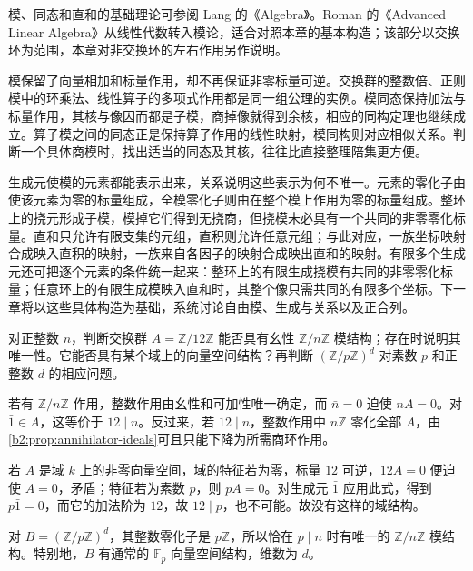 \ProseParagraphBreak
模、同态和直和的基础理论可参阅 Lang 的《Algebra》\cite[CHAPTER III, \S\S 1--3]{Lang2002}。Roman 的《Advanced Linear Algebra》\cite[Chapter 4, pp. 109--124]{Roman2008AdvancedLinearAlgebra}从线性代数转入模论，适合对照本章的基本构造；该部分以交换环为范围，本章对非交换环的左右作用另作说明。






\begin{chaptersummary}
	模保留了向量相加和标量作用，却不再保证非零标量可逆。交换群的整数倍、正则模中的环乘法、线性算子的多项式作用都是同一组公理的实例。模同态保持加法与标量作用，其核与像因而都是子模，商掉像就得到余核，相应的同构定理也继续成立。算子模之间的同态正是保持算子作用的线性映射，模同构则对应相似关系。判断一个具体商模时，找出适当的同态及其核，往往比直接整理陪集更方便。

	\ProseParagraphBreak
	生成元使模的元素都能表示出来，关系说明这些表示为何不唯一。元素的零化子由使该元素为零的标量组成，全模零化子则由在整个模上作用为零的标量组成。整环上的挠元形成子模，模掉它们得到无挠商，但挠模未必具有一个共同的非零零化标量。直和只允许有限支集的元组，直积则允许任意元组；与此对应，一族坐标映射合成映入直积的映射，一族来自各因子的映射合成映出直和的映射。有限多个生成元还可把逐个元素的条件统一起来：整环上的有限生成挠模有共同的非零零化标量；任意环上的有限生成模映入直和时，其整个像只需共同的有限多个坐标。下一章将以这些具体构造为基础，系统讨论自由模、生成与关系以及正合列。
\end{chaptersummary}

\BookExercises

\begin{exercise}\label{b2:ex:02-residue-scalars}
	对正整数 \(n\)，判断交换群 \(A=\mathbb Z/12\mathbb Z\) 能否具有幺性 \(\mathbb Z/n\mathbb Z\) 模结构；存在时说明其唯一性。它能否具有某个域上的向量空间结构？再判断 \((\mathbb Z/p\mathbb Z)^d\) 对素数 \(p\) 和正整数 \(d\) 的相应问题。
\end{exercise}
\begin{solution}
	若有 \(\mathbb Z/n\mathbb Z\) 作用，整数作用由幺性和可加性唯一确定，而 \(\bar n=0\) 迫使 \(nA=0\)。对 \(\bar1\in A\)，这等价于 \(12\mid n\)。反过来，若 \(12\mid n\)，整数作用中 \(n\mathbb Z\) 零化全部 \(A\)，由\cref{b2:prop:annihilator-ideals}可且只能下降为所需商环作用。

	若 \(A\) 是域 \(k\) 上的非零向量空间，域的特征若为零，标量 \(12\) 可逆，\(12A=0\) 便迫使 \(A=0\)，矛盾；特征若为素数 \(p\)，则 \(pA=0\)。对生成元 \(\bar1\) 应用此式，得到 \(p\bar1=0\)，而它的加法阶为 \(12\)，故 \(12\mid p\)，也不可能。故没有这样的域结构。

	对 \(B=(\mathbb Z/p\mathbb Z)^d\)，其整数零化子是 \(p\mathbb Z\)，所以恰在 \(p\mid n\) 时有唯一的 \(\mathbb Z/n\mathbb Z\) 模结构。特别地，\(B\) 有通常的 \(\mathbb F_p\) 向量空间结构，维数为 \(d\)。
\end{solution}

